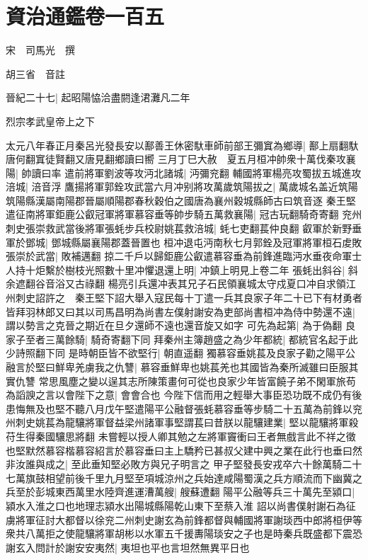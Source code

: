 \section{資治通鑑卷一百五}
宋　司馬光　撰

胡三省　音註

晉紀二十七|{
	起昭陽恊洽盡閼逢涒灘凡二年}


烈宗孝武皇帝上之下

太元八年春正月秦呂光發長安以鄯善王休密馱車師前部王彌窴為鄉導|{
	鄯上扇翻馱唐何翻窴徒賢翻又唐見翻鄉讀曰嚮}
三月丁巳大赦　夏五月桓冲帥衆十萬伐秦攻襄陽|{
	帥讀曰率}
遣前將軍劉波等攻沔北諸城|{
	沔彌兖翻}
輔國將軍楊亮攻蜀拔五城進攻涪城|{
	涪音浮}
鷹揚將軍郭銓攻武當六月冲别將攻萬歲筑陽拔之|{
	萬歲城名盖近筑陽筑陽縣漢屬南陽郡晉屬順陽郡春秋穀伯之國唐為襄州穀城縣師古曰筑音逐}
秦王堅遣征南將軍鉅鹿公叡冠軍將軍慕容垂等帥步騎五萬救襄陽|{
	冠古玩翻騎奇寄翻}
兖州刺史張崇救武當後將軍張蚝步兵校尉姚萇救涪城|{
	蚝七吏翻萇仲良翻}
叡軍於新野垂軍於鄧城|{
	鄧城縣屬襄陽郡蓋晉置也}
桓冲退屯沔南秋七月郭銓及冠軍將軍桓石䖍敗張崇於武當|{
	敗補邁翻}
掠二千戶以歸鉅鹿公叡遣慕容垂為前鋒進臨沔水垂夜命軍士人持十炬繫於樹枝光照數十里冲懼退還上明|{
	冲鎮上明見上卷二年}
張蚝出斜谷|{
	斜余遮翻谷音浴又古祿翻}
楊亮引兵還冲表其兄子石民領襄城太守戍夏口冲自求領江州刺史詔許之　秦王堅下詔大舉入寇民每十丁遣一兵其良家子年二十已下有材勇者皆拜羽林郎又曰其以司馬昌明為尚書左僕射謝安為吏部尚書桓冲為侍中勢還不遠|{
	謂以勢言之克晉之期近在旦夕還師不遠也還音旋又如字}
可先為起第|{
	為于偽翻}
良家子至者三萬餘騎|{
	騎奇寄翻下同}
拜秦州主簿趙盛之為少年都統|{
	都統官名起于此少詩照翻下同}
是時朝臣皆不欲堅行|{
	朝直遥翻}
獨慕容垂姚萇及良家子勸之陽平公融言於堅曰鮮卑羌虜我之仇讐|{
	慕容垂鮮卑也姚萇羌也其國皆為秦所滅雖曰臣服其實仇讐}
常思風塵之變以逞其志所陳策畫何可從也良家少年皆富饒子弟不閑軍旅苟為謟諛之言以會陛下之意|{
	會會合也}
今陛下信而用之輕舉大事臣恐功既不成仍有後患悔無及也堅不聽八月戊午堅遣陽平公融督張蚝慕容垂等步騎二十五萬為前鋒以兖州刺史姚萇為龍驤將軍督益梁州諸軍事堅謂萇曰昔朕以龍驤建業|{
	堅以龍驤將軍殺苻生得秦國驤思將翻}
未嘗輕以授人卿其勉之左將軍竇衝曰王者無戲言此不祥之徵也堅默然慕容楷慕容紹言於慕容垂曰主上驕矜已甚叔父建中興之業在此行也垂曰然非汝誰與成之|{
	至此垂知堅必敗方與兄子明言之}
甲子堅發長安戎卒六十餘萬騎二十七萬旗鼓相望前後千里九月堅至項城涼州之兵始達咸陽蜀漢之兵方順流而下幽冀之兵至於彭城東西萬里水陸齊進運漕萬艘|{
	艘蘇遭翻}
陽平公融等兵三十萬先至潁口|{
	潁水入淮之口也地理志潁水出陽城縣陽乾山東下至蔡入淮}
詔以尚書僕射謝石為征虜將軍征討大都督以徐兖二州刺史謝玄為前鋒都督與輔國將軍謝琰西中郎將桓伊等衆共八萬拒之使龍驤將軍胡彬以水軍五千援夀陽琰安之子也是時秦兵既盛都下震恐謝玄入問計於謝安安夷然|{
	夷坦也平也言坦然無異平日也}
